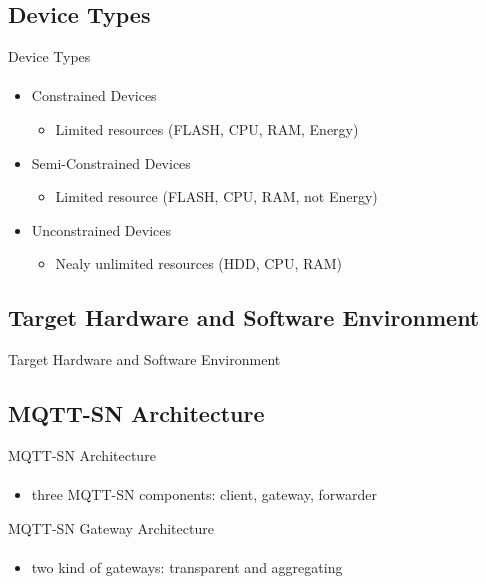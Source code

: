 \documentclass[10pt,aspectratio=\ratio,
compress
]{beamer}
\begin{document}
\subsection{Device Types}
\begin{frame}{Device Types}\framesubtitle{}
\begin{itemize}
	\item Constrained Devices
	\begin{itemize}
	\item Limited resources (FLASH, CPU, RAM, Energy)
	\end{itemize}
	\item Semi-Constrained Devices
	\begin{itemize}
		\item Limited resource (FLASH, CPU, RAM, not Energy)
	\end{itemize}
	\item Unconstrained Devices
	\begin{itemize}
		\item Nealy unlimited resources (HDD, CPU, RAM)
	\end{itemize}
\end{itemize}
\end{frame}

\subsection{Target Hardware and Software Environment}
\begin{frame}{Target Hardware and Software Environment}\framesubtitle{}
\end{frame}


\subsection{MQTT-SN Architecture}
\begin{frame}{MQTT-SN Architecture}\framesubtitle{}
\begin{itemize}
	\item three MQTT-SN components: client, gateway, forwarder
\end{itemize}
\end{frame}
\begin{frame}{MQTT-SN Gateway Architecture}\framesubtitle{}
	\begin{itemize}
		\item two kind of gateways: transparent and aggregating
	\end{itemize}
\end{frame}
\end{document}
